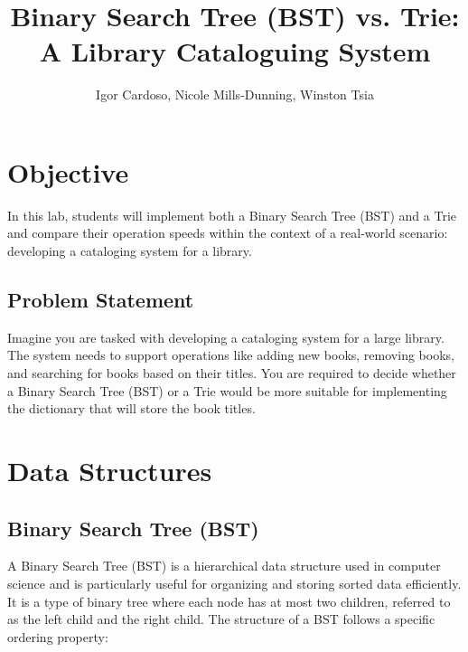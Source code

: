 \documentclass{article}
\title{\textbf{Binary Search Tree (BST) vs. Trie:\\A Library Cataloguing System}}
\date{}
\author{Igor Cardoso, Nicole Mills-Dunning, Winston Tsia}
\begin{document}
\maketitle

\section{Objective}
In this lab, students will implement both a Binary Search Tree (BST) and a Trie and compare their operation speeds within the context of a real-world scenario: developing a cataloging system for a library.

\subsection{Problem Statement}
Imagine you are tasked with developing a cataloging system for a large library. The system needs to support operations like adding new books, removing books, and searching for books based on their titles. You are required to decide whether a Binary Search Tree (BST) or a Trie would be more suitable for implementing the dictionary that will store the book titles.

\section{Data Structures}
\subsection{Binary Search Tree (BST)}

A Binary Search Tree (BST) is a hierarchical data structure used in computer science and is particularly useful for organizing and storing sorted data efficiently. It is a type of binary tree where each node has at most two children, referred to as the left child and the right child. The structure of a BST follows a specific ordering property:
\end{document}
